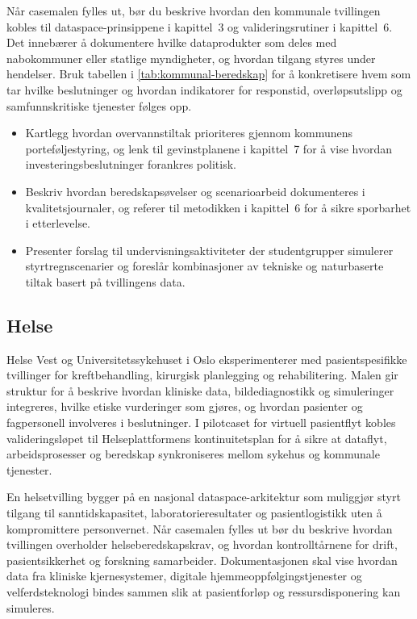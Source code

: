 Når casemalen fylles ut, bør du beskrive hvordan den kommunale tvillingen kobles til dataspace-prinsippene i kapittel~3 og valideringsrutiner i kapittel~6. Det innebærer å dokumentere hvilke dataprodukter som deles med nabokommuner eller statlige myndigheter, og hvordan tilgang styres under hendelser. Bruk tabellen i \autoref{tab:kommunal-beredskap} for å konkretisere hvem som tar hvilke beslutninger og hvordan indikatorer for responstid, overløpsutslipp og samfunnskritiske tjenester følges opp.

\begin{itemize}
    \item Kartlegg hvordan overvannstiltak prioriteres gjennom kommunens porteføljestyring, og lenk til gevinstplanene i kapittel~7 for å vise hvordan investeringsbeslutninger forankres politisk.
    \item Beskriv hvordan beredskapsøvelser og scenarioarbeid dokumenteres i kvalitetsjournaler, og referer til metodikken i kapittel~6 for å sikre sporbarhet i etterlevelse.
    \item Presenter forslag til undervisningsaktiviteter der studentgrupper simulerer styrtregnscenarier og foreslår kombinasjoner av tekniske og naturbaserte tiltak basert på tvillingens data.
\end{itemize}

\subsection*{Helse}
Helse Vest og Universitetssykehuset i Oslo eksperimenterer med pasientspesifikke tvillinger for kreftbehandling, kirurgisk planlegging og rehabilitering. Malen gir struktur for å beskrive hvordan kliniske data, bildediagnostikk og simuleringer integreres, hvilke etiske vurderinger som gjøres, og hvordan pasienter og fagpersonell involveres i beslutninger. I pilotcaset for virtuell pasientflyt kobles valideringsløpet til Helseplattformens kontinuitetsplan for å sikre at dataflyt, arbeidsprosesser og beredskap synkroniseres mellom sykehus og kommunale tjenester.\citep{helseplattformen2023kontinuitet}

En helsetvilling bygger på en nasjonal dataspace-arkitektur som muliggjør styrt tilgang til sanntidskapasitet, laboratorieresultater og pasientlogistikk uten å kompromittere personvernet.\citep{nhn2024dataspace} Når casemalen fylles ut bør du beskrive hvordan tvillingen overholder helseberedskapskrav, og hvordan kontrolltårnene for drift, pasientsikkerhet og forskning samarbeider.\citep{hod2020beredskap} Dokumentasjonen skal vise hvordan data fra kliniske kjernesystemer, digitale hjemmeoppfølgingstjenester og velferdsteknologi bindes sammen slik at pasientforløp og ressursdisponering kan simuleres.\citep{helsedir2020dho}

